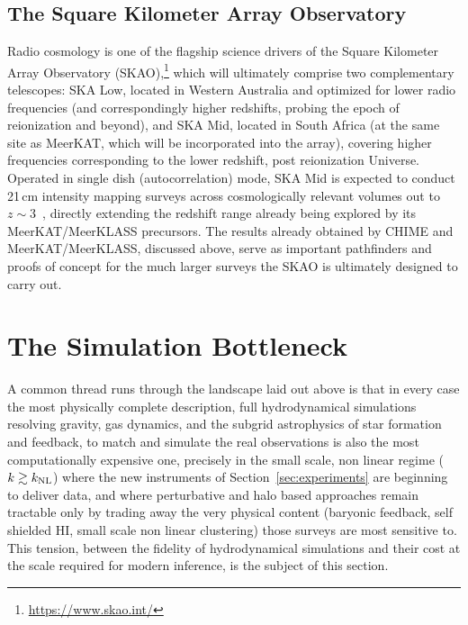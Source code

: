 \subsection{The Square Kilometer Array Observatory}

Radio cosmology is one of the flagship science drivers of the Square Kilometer Array Observatory (SKAO),\footnote{\url{https://www.skao.int/}} which will ultimately comprise two complementary telescopes: SKA Low, located in Western Australia and optimized for lower radio frequencies (and correspondingly higher redshifts, probing the epoch of reionization and beyond), and SKA Mid, located in South Africa (at the same site as MeerKAT, which will be incorporated into the array), covering higher frequencies corresponding to the lower redshift, post reionization Universe. Operated in single dish (autocorrelation) mode, SKA Mid is expected to conduct 21\,cm intensity mapping surveys across cosmologically relevant volumes out to $z\sim3$~\citep{Santos:2015,Bacon:2018}, directly extending the redshift range already being explored by its MeerKAT/MeerKLASS precursors. The results already obtained by CHIME and MeerKAT/MeerKLASS, discussed above, serve as important pathfinders and proofs of concept for the much larger surveys the SKAO is ultimately designed to carry out.


\section{The Simulation Bottleneck}
\label{sec:sim_bottleneck}


A common thread runs through the landscape laid out above is that in every case the most physically complete description, full hydrodynamical simulations resolving gravity, gas dynamics, and the subgrid astrophysics of star formation and feedback, to match and simulate the real observations is also the most computationally expensive one, precisely in the small scale, non linear regime ($k\gtrsim k_{\rm NL}$) where the new instruments of Section~\ref{sec:experiments} are beginning to deliver data, and where perturbative and halo based approaches remain tractable only by trading away the very physical content (baryonic feedback, self shielded HI, small scale non linear clustering) those surveys are most sensitive to. This tension, between the fidelity of hydrodynamical simulations and their cost at the scale required for modern inference, is the subject of this section.

